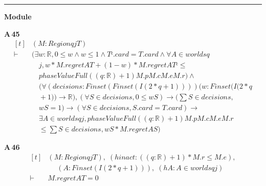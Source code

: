 \vspace{4pt}\noindent\rule{\columnwidth}{0.4pt}\par\vspace{2pt}
\noindent\textbf{Module }\par\vspace{3pt}

\noindent\textbf{A\,45}\quad{}
{\footnotesize\[ \begin{aligned}[t]
&(\mathit{M} : \mathit{Region} \mathit{q} \mathit{j} \mathit{T})\\
\vdash\;&(\exists \mathit{w} : \mathbb{R} ,0 \leq \mathit{w} \wedge \mathit{w} \leq 1 \wedge \mathit{Tᶜ}.\mathit{card}=\mathit{T}.\mathit{card} \wedge \forall \mathit{A} \in \mathit{worlds} \mathit{q}\\
&\quad \mathit{j},\mathit{w}*\mathit{M}.\mathit{regret} \mathit{A} \mathit{T}+(1-\mathit{w})*\mathit{M}.\mathit{regret} \mathit{A} \mathit{Tᶜ} \leq\\
&\quad \mathit{phaseValueFull} ((\mathit{q}:\mathbb{R} )+1) \mathit{M}.\mathit{p} \mathit{M}.\mathit{c} \mathit{M}.\mathit{e} \mathit{M}.\mathit{r}) \wedge\\
&\quad (\forall (\mathit{decisions} : \mathit{Finset} (\mathit{Finset} (\mathit{I} (2*\mathit{q}+1)))) (\mathit{w} : \mathit{Finset} (\mathit{I} (2*\mathit{q}\\
&\quad +1)) \to \mathbb{R} ), (\forall \mathit{S} \in \mathit{decisions},0 \leq \mathit{w} \mathit{S}) \to (\textstyle\sum \mathit{S} \in \mathit{decisions},\\
&\quad \mathit{w} \mathit{S}=1) \to (\forall \mathit{S} \in \mathit{decisions},\mathit{S}.\mathit{card}=\mathit{T}.\mathit{card}) \to\\
&\quad \exists \mathit{A} \in \mathit{worlds} \mathit{q} \mathit{j},\mathit{phaseValueFull} ((\mathit{q}:\mathbb{R} )+1) \mathit{M}.\mathit{p} \mathit{M}.\mathit{c} \mathit{M}.\mathit{e} \mathit{M}.\mathit{r}\\
&\quad \leq \textstyle\sum \mathit{S} \in \mathit{decisions},\mathit{w} \mathit{S}*\mathit{M}.\mathit{regret} \mathit{A} \mathit{S})
\end{aligned} \]}

\noindent\textbf{A\,46}\quad{}
{\footnotesize\[ \begin{aligned}[t]
&(\mathit{M} : \mathit{Region} \mathit{q} \mathit{j} \mathit{T}),\; (\mathit{hinact} : ((\mathit{q}:\mathbb{R} )+1)*\mathit{M}.\mathit{r} \leq \mathit{M}.\mathit{e}),\\
&\quad \; (\mathit{A} : \mathit{Finset} (\mathit{I} (2*\mathit{q}+1))),\; (\mathit{hA} : \mathit{A} \in \mathit{worlds} \mathit{q} \mathit{j})\\
\vdash\;&\mathit{M}.\mathit{regret} \mathit{A} \mathit{T}=0
\end{aligned} \]}


